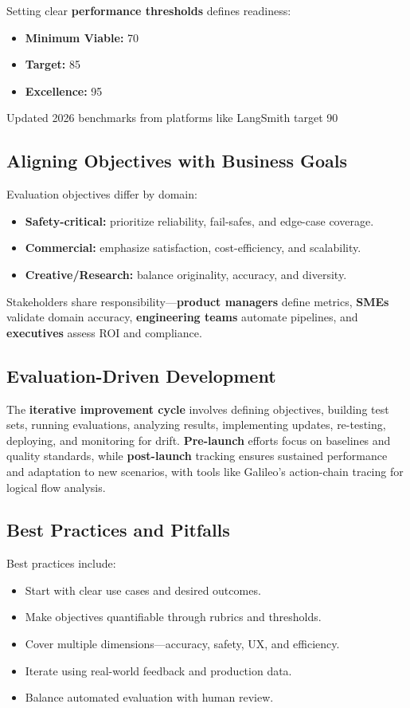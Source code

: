 \begin{TNtwocol}
Setting clear \textbf{performance thresholds} defines readiness:
\begin{itemize}
\item \textbf{Minimum Viable:} 70%
\item \textbf{Target:} 85%
\item \textbf{Excellence:} 95%
\end{itemize}
Updated 2026 benchmarks from platforms like LangSmith target 90%
​

\subsection*{Aligning Objectives with Business Goals}
Evaluation objectives differ by domain:
\begin{itemize}
\item \textbf{Safety-critical:} prioritize reliability, fail-safes, and edge-case coverage.
\item \textbf{Commercial:} emphasize satisfaction, cost-efficiency, and scalability.
\item \textbf{Creative/Research:} balance originality, accuracy, and diversity.
\end{itemize}

Stakeholders share responsibility—\textbf{product managers} define metrics, \textbf{SMEs} validate domain accuracy, \textbf{engineering teams} automate pipelines, and \textbf{executives} assess ROI and compliance.

\subsection*{Evaluation-Driven Development}
The \textbf{iterative improvement cycle} involves defining objectives, building test sets, running evaluations, analyzing results, implementing updates, re-testing, deploying, and monitoring for drift. \textbf{Pre-launch} efforts focus on baselines and quality standards, while \textbf{post-launch} tracking ensures sustained performance and adaptation to new scenarios, with tools like Galileo's action-chain tracing for logical flow analysis.
​

\subsection*{Best Practices and Pitfalls}
Best practices include:
\begin{itemize}
\item Start with clear use cases and desired outcomes.
\item Make objectives quantifiable through rubrics and thresholds.
\item Cover multiple dimensions—accuracy, safety, UX, and efficiency.
\item Iterate using real-world feedback and production data.
\item Balance automated evaluation with human review.
\end{itemize}


\end{TNtwocol}
